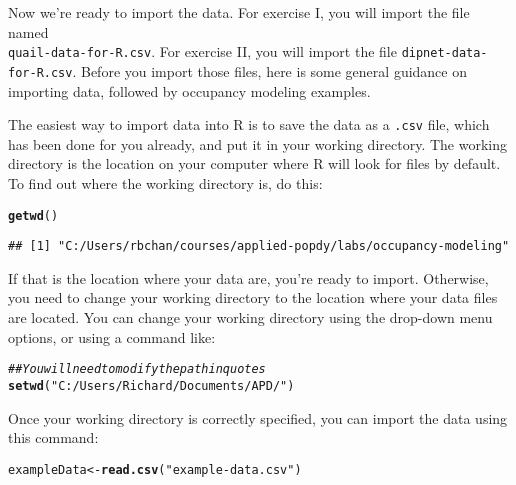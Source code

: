 \documentclass[12pt]{article}\usepackage[]{graphicx}\usepackage[]{color}
\makeatletter
\newcommand{\hlstr}[1]{\textcolor[rgb]{0.192,0.494,0.8}{#1}}%
\newcommand{\hlcom}[1]{\textcolor[rgb]{0.678,0.584,0.686}{\textit{#1}}}%
\newcommand{\hlstd}[1]{\textcolor[rgb]{0.345,0.345,0.345}{#1}}%
\newcommand{\hlkwb}[1]{\textcolor[rgb]{0.69,0.353,0.396}{#1}}%
\newcommand{\hlkwd}[1]{\textcolor[rgb]{0.737,0.353,0.396}{\textbf{#1}}}%
\newenvironment{kframe}{%
 \def\at@end@of@kframe{}%
 \ifinner\ifhmode%
  \def\at@end@of@kframe{\end{minipage}}%
  \begin{minipage}{\columnwidth}%
 \fi\fi%
 \def\FrameCommand##1{\hskip\@totalleftmargin \hskip-\fboxsep
 \colorbox{shadecolor}{##1}\hskip-\fboxsep
     \hskip-\linewidth \hskip-\@totalleftmargin \hskip\columnwidth}%
 \MakeFramed {\advance\hsize-\width
   \@totalleftmargin\z@ \linewidth\hsize
   \@setminipage}}%
 {\par\unskip\endMakeFramed%
 \at@end@of@kframe}
\newenvironment{knitrout}{}{} %
\makeatother
\begin{document}
Now we're ready to import the data. For exercise I, you will import
the file named \\ \texttt{quail-data-for-R.csv}. For exercise II, you
will import the file \texttt{dipnet-data-for-R.csv}. Before you import
those files, here is some general guidance on importing data, followed
by occupancy modeling examples.


The easiest way to import data into R is to save the data as a
\texttt{.csv} file, which has been done for you already, and put it in
your working directory. The working directory is the location on your
computer where R will look for files by default. To find out
where the working directory is, do this:  
    
\begin{knitrout}
\color{fgcolor}\begin{kframe}
\begin{alltt}
\hlkwd{getwd}\hlstd{()}
\end{alltt}
\begin{verbatim}
## [1] "C:/Users/rbchan/courses/applied-popdy/labs/occupancy-modeling"
\end{verbatim}
\end{kframe}
\end{knitrout}

If that is the location where your data are, you're ready to
import. Otherwise, you need to change your working directory to the
location where your data files are located. You can change your
working directory using the drop-down menu options, or using a command
like:   

\begin{knitrout}
\color{fgcolor}\begin{kframe}
\begin{alltt}
\hlcom{## You will need to modify the path in quotes}
\hlkwd{setwd}\hlstd{(}\hlstr{"C:/Users/Richard/Documents/APD/"}\hlstd{)}
\end{alltt}
\end{kframe}
\end{knitrout}

Once your working directory is correctly specified, you can import the
data using this command: 

\begin{knitrout}
\color{fgcolor}\begin{kframe}
\begin{alltt}
\hlstd{exampleData} \hlkwb{<-} \hlkwd{read.csv}\hlstd{(}\hlstr{"example-data.csv"}\hlstd{)}
\end{alltt}
\end{kframe}
\end{knitrout}
\end{document}
